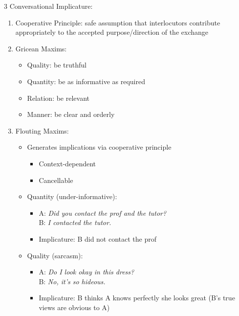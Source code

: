 \documentclass[12pt, a4paper]{article}
\begin{document}
\begin{multicols*}{3}
\colbreak
Conversational Implicature:
\begin{enumerate}[\roman*.]
  \item Cooperative Principle: safe assumption that interlocutors contribute appropriately to the accepted purpose/direction of the exchange
  \item Gricean Maxims:
    \begin{itemize}[leftmargin=*]\vspace{3pt}
      \item Quality: be truthful
      \item Quantity: be as informative as required
      \item Relation: be relevant
      \item Manner: be clear and orderly
    \end{itemize}
  \item Flouting Maxims:
    \begin{itemize}[leftmargin=*]\vspace{3pt}
      \item Generates implications via cooperative principle
      \begin{itemize}[leftmargin=*]\vspace{3pt}
        \item Context-dependent 
        \item Cancellable 
      \end{itemize}
      \item Quantity (under-informative):
        \begin{itemize}[leftmargin=*]\vspace{2pt}
          \item A: \textit{Did you contact the prof and the tutor?}\\
                B: \textit{I contacted the tutor.}
          \item Implicature: B did not contact the prof 
        \end{itemize}
      \item Quality (sarcasm):
        \begin{itemize}[leftmargin=*]\vspace{2pt}
          \item A: \textit{Do I look okay in this dress?}\\
                B: \textit{No, it's so hideous.}
          \item Implicature: B thinks A knows perfectly she looks great (B's true views are obvious to A)
        \end{itemize}

\end{itemize}
\end{enumerate}
\end{multicols*}
\end{document}
